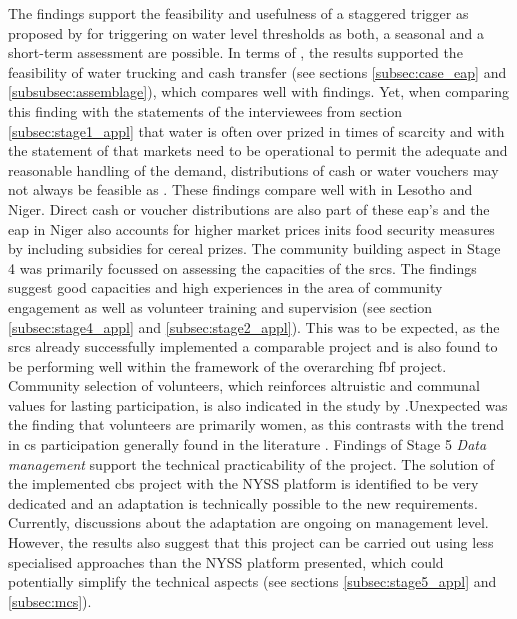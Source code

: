 The findings support the feasibility and usefulness of a staggered trigger as proposed by \autocite{rcrcFORECASTBASEDFINANCINGEARLY2020} for triggering on water level thresholds as both, a seasonal and a short-term assessment are possible. In terms of , the results supported the feasibility of water trucking and cash transfer  (see sections \ref{subsec:case_eap} and \ref{subsubsec:assemblage}), which compares well with \autocite{gettliffeOCHAAnticipatoryAction2021} findings. Yet, when comparing this finding with the statements of the interviewees from section \ref{subsec:stage1_appl} that water is often over prized in times of scarcity and with the statement of \autocite{ochaANTICIPATORYACTIONPLAN2020} that markets need to be operational to permit the adequate and reasonable handling of the demand, distributions of cash or water vouchers may not always be feasible as . These findings compare well with  in Lesotho and Niger. Direct cash or voucher distributions are also part of these \acrshort{eap}'s  and the \acrshort{eap} in Niger also accounts for higher market prices inits food security measures by including subsidies for cereal prizes.
The community building aspect in Stage 4 was primarily focussed on assessing the capacities of the \acrshort{srcs}. The findings suggest good capacities and high experiences in the area of community engagement as well as volunteer training and supervision (see section \ref{subsec:stage4_appl} and \ref{subsec:stage2_appl}). This was to be expected, as the \acrshort{srcs} already successfully implemented a comparable project and is also found to be performing well within the framework of the overarching \acrshort{fbf} project. Community selection of volunteers, which reinforces altruistic and communal values for lasting participation, is also indicated in the study by \autocite{rotmanDynamicChangesMotivation2012}.Unexpected was the finding that volunteers are primarily women, as this contrasts with the trend in \acrshort{cs} participation generally found in the literature \autocite{ibrahimGenderImbalanceSpatiotemporal2021,patemanDiversityParticipantsEnvironmental2021}.\newline
Findings of Stage 5 \textit{Data management} support the technical practicability of the project. The solution of the implemented \acrshort{cbs} project with the NYSS platform is identified to be very dedicated and an adaptation is technically possible to the new requirements. Currently, discussions about the adaptation are ongoing on management level. However, the results also suggest that this project can be carried out using less specialised approaches than the NYSS platform presented, which could potentially simplify the technical aspects (see sections \ref{subsec:stage5_appl} and \ref{subsec:mcs}).\newline
